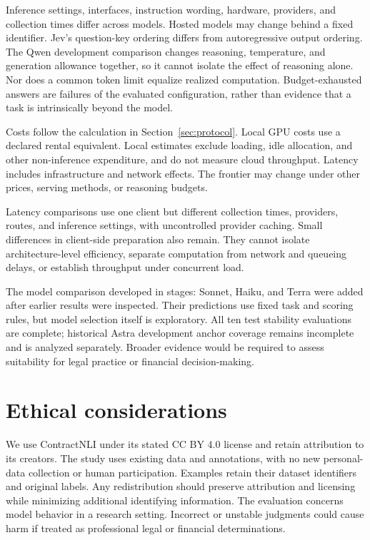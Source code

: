 \documentclass{article}
\begin{document}
Inference settings, interfaces, instruction wording, hardware, providers, and collection times differ across models. Hosted models may change behind a fixed identifier. Jev's question-key ordering differs from autoregressive output ordering. The Qwen development comparison changes reasoning, temperature, and generation allowance together, so it cannot isolate the effect of reasoning alone. Nor does a common token limit equalize realized computation. Budget-exhausted answers are failures of the evaluated configuration, rather than evidence that a task is intrinsically beyond the model.

Costs follow the calculation in Section~\ref{sec:protocol}. Local GPU costs use a declared rental equivalent. Local estimates exclude loading, idle allocation, and other non-inference expenditure, and do not measure cloud throughput. Latency includes infrastructure and network effects. The frontier may change under other prices, serving methods, or reasoning budgets.

Latency comparisons use one client but different collection times, providers, routes, and inference settings, with uncontrolled provider caching. Small differences in client-side preparation also remain. They cannot isolate architecture-level efficiency, separate computation from network and queueing delays, or establish throughput under concurrent load.

The model comparison developed in stages: Sonnet, Haiku, and Terra were added after earlier results were inspected. Their predictions use fixed task and scoring rules, but model selection itself is exploratory. All ten test stability evaluations are complete; historical Astra development anchor coverage remains incomplete and is analyzed separately. Broader evidence would be required to assess suitability for legal practice or financial decision-making.

\section*{Ethical considerations}
We use ContractNLI under its stated CC BY 4.0 license and retain attribution to its creators. The study uses existing data and annotations, with no new personal-data collection or human participation. Examples retain their dataset identifiers and original labels. Any redistribution should preserve attribution and licensing while minimizing additional identifying information. The evaluation concerns model behavior in a research setting. Incorrect or unstable judgments could cause harm if treated as professional legal or financial determinations.
\end{document}
